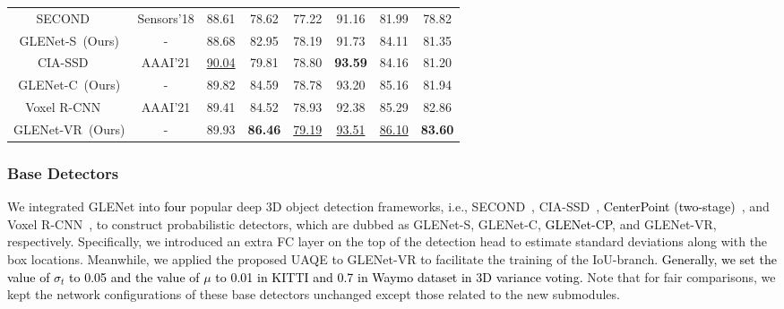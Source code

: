 \documentclass[twocolumn]{svjour3}
\newcommand{\revise}[1]{\textcolor{black}{#1}}
\begin{document}
\begin{table*}[htp]
\begin{tabular}{c|c|ccc|ccc}
\hline
SECOND~\citep{yan2018second}~                 & Sensors'18               & 88.61 & 78.62    & 77.22                    & 91.16 & 81.99    & 78.82                  \\
GLENet-S~(Ours)         & -                          & 88.68 & 82.95    & 78.19                    & 91.73 & 84.11    & 81.35                  \\ 
\hline
CIA-SSD~\citep{zheng2021cia}~                & AAAI'21                  & \underline{90.04} & 79.81    & 78.80                    & \textbf{93.59} & 84.16    & 81.20                  \\
GLENet-C~(Ours)         & -                          & 89.82 & 84.59    & 78.78                    & 93.20 & 85.16    & 81.94                  \\ 
\hline
Voxel R-CNN~\citep{deng2021voxel}~            & AAAI'21                  & 89.41 & 84.52    & 78.93                    & 92.38 & 85.29    & 82.86                  \\
GLENet-VR~(Ours)        & -                          & 89.93 & \textbf{86.46}    & \underline{79.19}                    & \underline{93.51} & \underline{86.10}    & \textbf{83.60}                  \\
\hline
\end{tabular}
\end{table*}
\setlength{\tabcolsep}{1.5pt}

\subsubsection{Base Detectors} We integrated GLENet into \revise{four} popular deep 3D object detection frameworks, i.e., SECOND~\citep{yan2018second}, CIA-SSD~\citep{zheng2021cia}, \revise{CenterPoint (two-stage)}~\citep{yin2021center},  and Voxel R-CNN~\citep{deng2021voxel}, to construct probabilistic detectors, which are dubbed as GLENet-S, GLENet-C, \revise{GLENet-CP}, and GLENet-VR, respectively. Specifically, we introduced an extra FC layer on the top of the detection head to estimate standard deviations along with the box locations. Meanwhile, we applied the proposed UAQE to GLENet-VR to facilitate the training of the IoU-branch. \revise{Generally, we set the value of $\sigma_t$ to 0.05 and the value of $\mu$ to 0.01 in KITTI and 0.7 in Waymo dataset in 3D variance voting.} Note that for fair comparisons, we kept the network configurations of these base detectors unchanged except those related to the new submodules.
\end{document}
